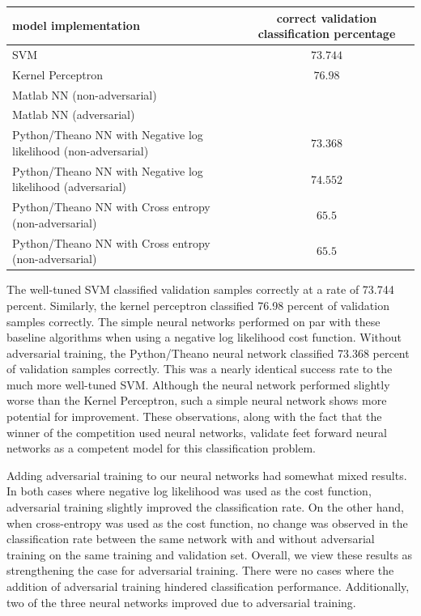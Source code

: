 \documentclass{article} %
\begin{document}
\begin{center}
	\begin{tabular}{|l|c|}
	  \hline
	  model implementation&correct validation classification percentage \\
		\hline
		SVM&$73.744$ \\
		\hline
		Kernel Perceptron&$76.98$ \\
		\hline
		Matlab NN (non-adversarial)&  \\
		\hline
		Matlab NN (adversarial)&  \\
	  \hline
	  Python/Theano NN with Negative log likelihood (non-adversarial)&$73.368$ \\
		\hline
		Python/Theano NN with Negative log likelihood (adversarial)&$74.552$ \\
	  \hline
	  Python/Theano NN with Cross entropy (non-adversarial)&$65.5$ \\
		\hline
	  Python/Theano NN with Cross entropy (non-adversarial)&$65.5$ \\
	  \hline
	\end{tabular}
\end{center}
 
The well-tuned SVM classified validation samples correctly at a rate of 73.744 percent. Similarly, the kernel perceptron classified 76.98 percent of validation samples correctly. The simple neural networks performed on par with these baseline algorithms when using a negative log likelihood cost function. Without adversarial training, the Python/Theano neural network classified 73.368 percent of validation samples correctly. This was a nearly identical success rate to the much more well-tuned SVM. Although the neural network performed slightly worse than the Kernel Perceptron, such a simple neural network shows more potential for improvement. These observations, along with the fact that the winner of the competition used neural networks, validate feet forward neural networks as a competent model for this classification problem.

Adding adversarial training to our neural networks had somewhat mixed results. In both cases where negative log likelihood was used as the cost function, adversarial training slightly improved the classification rate. On the other hand, when cross-entropy was used as the cost function, no change was observed in the classification rate between the same network with and without adversarial training on the same training and validation set. Overall, we view these results as strengthening the case for adversarial training. There were no cases where the addition of adversarial training hindered classification performance. Additionally, two of the three neural networks improved due to adversarial training.
\end{document}
